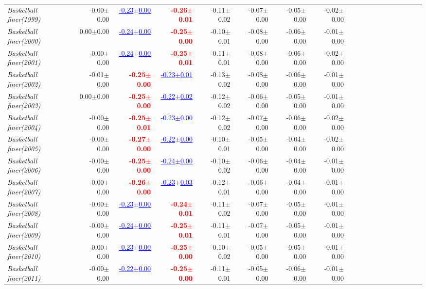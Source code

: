 \documentclass[nohyperref]{article}
\theoremstyle{plain}
\theoremstyle{definition}
\theoremstyle{remark}
\newcommand{\red}[1]{\textcolor{red}{\textbf{#1}}}
\newcommand{\blue}[1]{\textcolor{blue}{\underline{#1}}}
\begin{document}
\begin{table*}[!ht]
{\begin{tabular}{lrrrrrrrrrrrrrrrrrr}
			{\it Basketball finer(1999)} & -0.00$\pm$0.00 & \blue{-0.23$\pm$0.00} & \red{-0.26$\pm$0.01} & -0.11$\pm$0.02 & -0.07$\pm$0.00 & -0.05$\pm$0.00 & -0.02$\pm$0.00 \\
			{\it Basketball finer(2000)} & 0.00$\pm$0.00 & \blue{-0.24$\pm$0.00} & \red{-0.25$\pm$0.00} & -0.10$\pm$0.01 & -0.08$\pm$0.00 & -0.06$\pm$0.00 & -0.01$\pm$0.00 \\
			{\it Basketball finer(2001)} & -0.00$\pm$0.00 & \blue{-0.24$\pm$0.00} & \red{-0.25$\pm$0.01} & -0.11$\pm$0.01 & -0.08$\pm$0.00 & -0.06$\pm$0.00 & -0.02$\pm$0.00 \\
			{\it Basketball finer(2002)} & -0.01$\pm$0.00 & \red{-0.25$\pm$0.00} & \blue{-0.23$\pm$0.01} & -0.13$\pm$0.02 & -0.08$\pm$0.00 & -0.06$\pm$0.00 & -0.01$\pm$0.00 \\
			{\it Basketball finer(2003)} & 0.00$\pm$0.00 & \red{-0.25$\pm$0.00} & \blue{-0.22$\pm$0.02} & -0.12$\pm$0.02 & -0.06$\pm$0.00 & -0.05$\pm$0.00 & -0.01$\pm$0.00 \\
			{\it Basketball finer(2004)} & -0.00$\pm$0.00 & \red{-0.25$\pm$0.01} & \blue{-0.23$\pm$0.00} & -0.12$\pm$0.02 & -0.07$\pm$0.00 & -0.06$\pm$0.00 & -0.02$\pm$0.00 \\
			{\it Basketball finer(2005)} & -0.00$\pm$0.00 & \red{-0.27$\pm$0.00} & \blue{-0.22$\pm$0.00} & -0.10$\pm$0.01 & -0.05$\pm$0.00 & -0.04$\pm$0.00 & -0.02$\pm$0.00 \\
			{\it Basketball finer(2006)} & -0.00$\pm$0.00 & \red{-0.25$\pm$0.00} & \blue{-0.24$\pm$0.00} & -0.10$\pm$0.02 & -0.06$\pm$0.00 & -0.04$\pm$0.00 & -0.01$\pm$0.00 \\
			{\it Basketball finer(2007)} & -0.00$\pm$0.00 & \red{-0.26$\pm$0.00} & \blue{-0.23$\pm$0.03} & -0.12$\pm$0.01 & -0.06$\pm$0.00 & -0.04$\pm$0.00 & -0.01$\pm$0.00 \\
			{\it Basketball finer(2008)} & -0.00$\pm$0.00 & \blue{-0.23$\pm$0.00} & \red{-0.24$\pm$0.01} & -0.11$\pm$0.02 & -0.07$\pm$0.00 & -0.05$\pm$0.00 & -0.01$\pm$0.00 \\
			{\it Basketball finer(2009)} & -0.00$\pm$0.00 & \blue{-0.24$\pm$0.00} & \red{-0.25$\pm$0.01} & -0.11$\pm$0.01 & -0.07$\pm$0.00 & -0.05$\pm$0.00 & -0.01$\pm$0.00 \\
			{\it Basketball finer(2010)} & -0.00$\pm$0.00 & \blue{-0.23$\pm$0.00} & \red{-0.25$\pm$0.00} & -0.10$\pm$0.02 & -0.05$\pm$0.00 & -0.05$\pm$0.00 & -0.01$\pm$0.00 \\
			{\it Basketball finer(2011)} & -0.00$\pm$0.00 & \blue{-0.22$\pm$0.00} & \red{-0.25$\pm$0.00} & -0.11$\pm$0.01 & -0.05$\pm$0.00 & -0.06$\pm$0.00 & -0.01$\pm$0.00 \\

\end{tabular}}
\end{table*}
\end{document}
